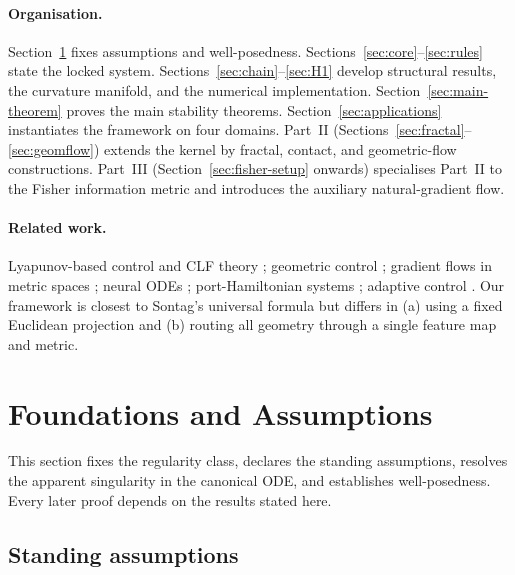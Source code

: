 \documentclass[11pt,oneside]{amsart}
\theoremstyle{plain}
\theoremstyle{definition}
\begin{document}
\paragraph{Organisation.} Section~\ref{sec:foundations} fixes
assumptions and well-posedness. Sections~\ref{sec:core}--\ref{sec:rules}
state the locked system. Sections~\ref{sec:chain}--\ref{sec:H1} develop
structural results, the curvature manifold, and the numerical
implementation. Section~\ref{sec:main-theorem} proves the main
stability theorems. Section~\ref{sec:applications} instantiates the
framework on four domains. Part~II
(Sections~\ref{sec:fractal}--\ref{sec:geomflow}) extends the kernel by
fractal, contact, and geometric-flow constructions. Part~III
(Section~\ref{sec:fisher-setup} onwards) specialises Part~II to the
Fisher information metric and introduces the auxiliary
natural-gradient flow.

\paragraph{Related work.}
Lyapunov-based control and CLF theory \cite{sontag1989,freeman1996};
geometric control \cite{bullo2004}; gradient flows in metric spaces
\cite{ambrosio2005}; neural ODEs \cite{chen2018}; port-Hamiltonian
systems \cite{vanderschaft2014}; adaptive control
\cite{ioannou1996}. Our framework is closest to Sontag's
universal formula but differs in (a) using a fixed Euclidean projection
and (b) routing all geometry through a single feature map and metric.

\section{Foundations and Assumptions}
\label{sec:foundations}

This section fixes the regularity class, declares the standing
assumptions, resolves the apparent singularity in the canonical ODE,
and establishes well-posedness. Every later proof depends on the
results stated here.

\subsection{Standing assumptions}
\label{sec:assumptions}
\end{document}
